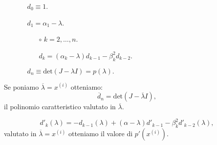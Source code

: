 \begin{exe}
{\samepage\begin{itemize}
\item[]
\begin{itemize}
\item[] $d_0 \equiv 1$.
\item[] $d_1 = \alpha_1 - \lambda$.
\item[]\begin{itemize}
  \item[$\circ$]$k = 2, \ldots, n.$
  \item[]$d_k = (\alpha_k - \lambda)d_{k-1} - \beta_k^2d_{k-2}$.
  \end{itemize}
\item[]$d_n \equiv \textrm{det}\left(J - \lambda I\right) = p(\lambda).$
\end{itemize}       
\end{itemize}
}

Se poniamo $\overline{\lambda} = x^{(i)}$ otteniamo:
\[\overline{d}_n = \textrm{det}\left(J - \overline{\lambda} I\right),\]
il polinomio caratteristico valutato in $\overline{\lambda}$.

\[
d'_k(\lambda) = -d_{k-1}(\lambda) +  (\alpha - \lambda)d'_{k-1} 
- \beta_k^2d'_{k-2}(\lambda),
\]
valutato in $\overline{\lambda} = x^{(i)}$ otteniamo il valore di $p'(x^{(i)})$.
\end{exe}

